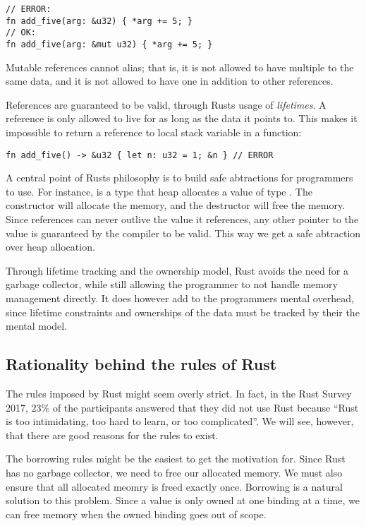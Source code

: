 \documentclass[b5paper,twoside]{report}
\begin{document}
\begin{lstlisting}[firstnumber=last]
// ERROR:
fn add_five(arg: &u32) { *arg += 5; }
// OK:
fn add_five(arg: &mut u32) { *arg += 5; }
\end{lstlisting}

Mutable references cannot alias; that is, it is not allowed to have multiple 
to the same data, and it is not allowed to have one  in addition to other
references.

References are guaranteed to be valid, through Rusts usage of \emph{lifetimes}.
A reference is only allowed to live for as long as the data it points to.
This makes it impossible to return a reference to local stack variable in a function:
\begin{lstlisting}[firstnumber=last]
fn add_five() -> &u32 { let n: u32 = 1; &n } // ERROR
\end{lstlisting}

A central point of Rusts philosophy is to build safe abtractions for programmers to use.
For instance,  is a type that heap allocates a value of type .
The constructor will allocate the memory, and the destructor will free the memory.
Since references can never outlive the value it references, any other pointer to the value
is guaranteed by the compiler to be valid.
This way we get a safe abtraction over heap allocation.

Through lifetime tracking and the ownership model, Rust avoids the need for a
garbage collector, while still allowing the programmer to not handle memory
management directly. It does however add to the programmers mental overhead,
since lifetime constraints and ownerships of the data must be tracked by their
the mental model.



\subsection{Rationality behind the rules of Rust}
The rules imposed by Rust might seem overly strict.
In fact, in the Rust Survey 2017, $23\%$ of the participants answered
that they did not use Rust because ``Rust is too intimidating,
too hard to learn, or too complicated''\cite{rustsurvey2017}.
We will see, however, that there are good reasons for the rules to exist.

The borrowing rules might be the easiest to get the motivation for.
Since Rust has no garbage collector, we need to free our allocated memory.
We must also ensure that all allocated meomry is freed exactly once.
Borrowing is a natural solution to this problem. Since a value is only
owned at one binding at a time, we can free memory when the owned binding
goes out of scope.
\end{document}
